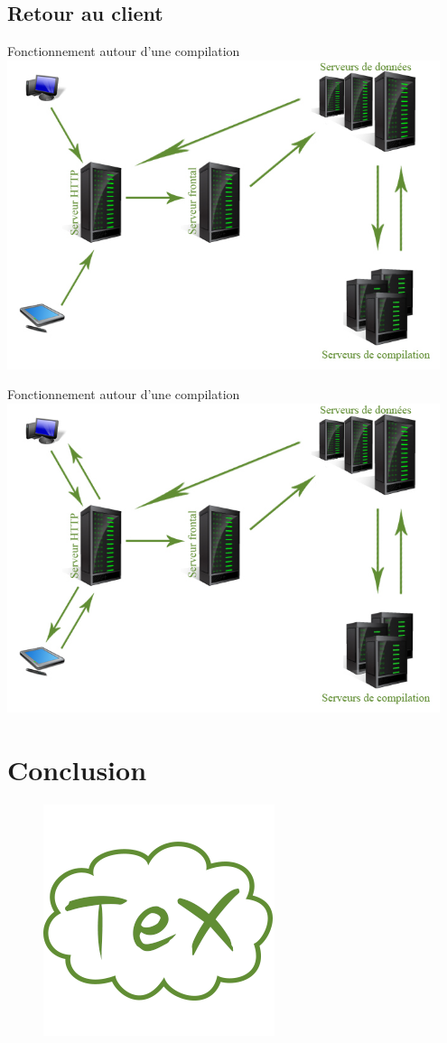 \documentclass{beamer}
\begin{document}
\subsection{Retour au client}
\begin{frame}{Fonctionnement autour d'une compilation}
 	\includegraphics[width=0.95\textwidth]{./images/step9}
\end{frame}
\begin{frame}{Fonctionnement autour d'une compilation}
 	\includegraphics[width=0.95\textwidth]{./images/step10}
\end{frame}

\section{Conclusion}
\begin{frame}
 \begin{figure}
  	\includegraphics[scale=0.7]{./images/logoTexloud}
	\centering
 \end{figure}
\end{frame}
\end{document}
